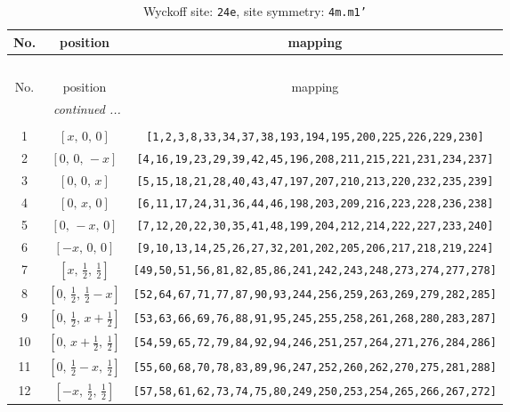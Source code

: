 \documentclass[fleqn,8pt]{jsarticle}
\begin{document}
\begin{longtable}{ccc}
\caption{Wyckoff site: {\tt 24e}, site symmetry: {\tt 4m.m1'}}
 \\
 \hline \hline
No. & position & mapping \\ \hline \endfirsthead

\multicolumn{2}{l}{\tablename\ \thetable{}} \\
 \hline \hline
No. & position & mapping \\ \hline \endhead

 \hline \hline
\multicolumn{2}{r}{\footnotesize\it continued ...} \\ \endfoot

 \hline \hline
\multicolumn{2}{r}{} \\ \endlastfoot

1 & $\left[ x,\, 0,\, 0 \right]$ & {\tt [1,2,3,8,33,34,37,38,193,194,195,200,225,226,229,230]} \\ \hline
2 & $\left[ 0,\, 0,\, - x \right]$ & {\tt [4,16,19,23,29,39,42,45,196,208,211,215,221,231,234,237]} \\ \hline
3 & $\left[ 0,\, 0,\, x \right]$ & {\tt [5,15,18,21,28,40,43,47,197,207,210,213,220,232,235,239]} \\ \hline
4 & $\left[ 0,\, x,\, 0 \right]$ & {\tt [6,11,17,24,31,36,44,46,198,203,209,216,223,228,236,238]} \\ \hline
5 & $\left[ 0,\, - x,\, 0 \right]$ & {\tt [7,12,20,22,30,35,41,48,199,204,212,214,222,227,233,240]} \\ \hline
6 & $\left[ - x,\, 0,\, 0 \right]$ & {\tt [9,10,13,14,25,26,27,32,201,202,205,206,217,218,219,224]} \\ \hline
7 & $\left[ x,\, \frac{1}{2},\, \frac{1}{2} \right]$ & {\tt [49,50,51,56,81,82,85,86,241,242,243,248,273,274,277,278]} \\ \hline
8 & $\left[ 0,\, \frac{1}{2},\, \frac{1}{2} - x \right]$ & {\tt [52,64,67,71,77,87,90,93,244,256,259,263,269,279,282,285]} \\ \hline
9 & $\left[ 0,\, \frac{1}{2},\, x + \frac{1}{2} \right]$ & {\tt [53,63,66,69,76,88,91,95,245,255,258,261,268,280,283,287]} \\ \hline
10 & $\left[ 0,\, x + \frac{1}{2},\, \frac{1}{2} \right]$ & {\tt [54,59,65,72,79,84,92,94,246,251,257,264,271,276,284,286]} \\ \hline
11 & $\left[ 0,\, \frac{1}{2} - x,\, \frac{1}{2} \right]$ & {\tt [55,60,68,70,78,83,89,96,247,252,260,262,270,275,281,288]} \\ \hline
12 & $\left[ - x,\, \frac{1}{2},\, \frac{1}{2} \right]$ & {\tt [57,58,61,62,73,74,75,80,249,250,253,254,265,266,267,272]} \\ \hline

\end{longtable}
\end{document}
